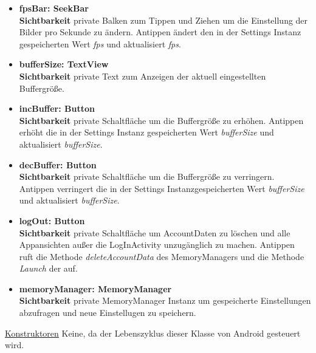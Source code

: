 \begin{itemize}
\item \textbf{fpsBar: SeekBar} \hfill\\ 
\textbf{Sichtbarkeit} private \newline
Balken zum Tippen und Ziehen um die Einstellung der  Bilder pro Sekunde zu ändern. Antippen ändert den in der Settings Instanz gespeicherten Wert \textit{fps} und aktualisiert \textit{fps}.

\item \textbf{bufferSize: TextView} \hfill\\ 
\textbf{Sichtbarkeit} private \newline
Text zum Anzeigen der aktuell eingestellten Buffergröße.

\item \textbf{incBuffer: Button} \hfill\\ 
\textbf{Sichtbarkeit} private \newline
Schaltfläche um die Buffergröße zu erhöhen. Antippen erhöht die in der Settings Instanz gespeicherten Wert \textit{bufferSize} und aktualisiert \textit{bufferSize}.

\item \textbf{decBuffer: Button} \hfill\\ 
\textbf{Sichtbarkeit} private \newline
Schaltfläche um die Buffergröße zu verringern. Antippen verringert die in der Settings Instanzgespeicherten Wert \textit{bufferSize} und aktualisiert \textit{bufferSize}.

\item \textbf{logOut: Button} \hfill\\ 
\textbf{Sichtbarkeit} private \newline
Schaltfläche um AccountDaten zu löschen und alle Appansichten außer die LogInActivity unzugänglich zu machen. Antippen ruft die Methode \textit{deleteAccountData} des MemoryManagers und die Methode \textit{Launch} der  auf.

\item \textbf{memoryManager: MemoryManager} \hfill\\ 
\textbf{Sichtbarkeit} private \newline
MemoryManager Instanz um gespeicherte Einstellungen abzufragen und neue Einstellugen zu speichern.

\end{itemize}

\underline{Konstruktoren}\newline
\indent Keine, da der Lebenszyklus dieser Klasse von Android gesteuert wird.\newline

